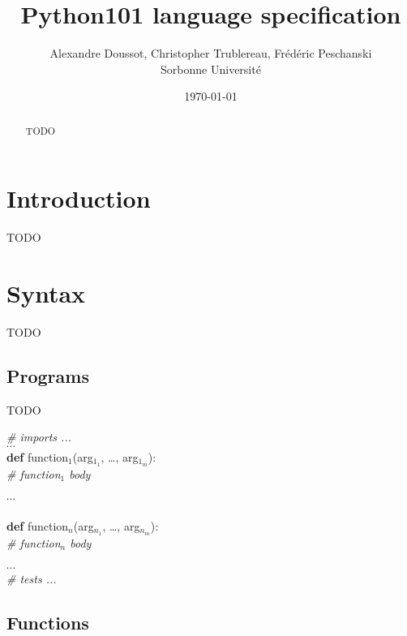 \documentclass[a4paper]{article}
\newenvironment{program}{
\begin{sffamily}
\begin{scriptsize}
\begin{tabbing}}
{\end{tabbing}
\end{scriptsize}
\end{sffamily}}
\newcommand{\kw}[1]{\textsf{\textbf{#1}}}
\newcommand{\cmt}[1]{\textsf{\textit{#1}}}
\newcommand{\pindent}{\hspace{2em}\=}
\begin{document}
\setlength{\parskip}{1ex}
\setlength{\parindent}{0mm}


\title{Python101 language specification}

\author{Alexandre Doussot, Christopher Trublereau, Fr\' ed\' eric Peschanski\\
Sorbonne Universit\' e}

\date{\today}

\maketitle
\begin{abstract}
TODO
\end{abstract}

\thispagestyle{fancy}

\section{Introduction}

TODO

\section{Syntax}

TODO

\subsection{Programs}

TODO

\begin{program}
\cmt{\# imports ...}\\
$\cdots$\\
\kw{def} function$_1$(arg$_{1_1}$, \ldots, arg$_{1_m}$):\\
\pindent \cmt{\# function$_1$ body}\\
\\
$\cdots$ \\
\\
\kw{def} function$_n$(arg$_{n_1}$, \ldots, arg$_{n_m}$):\\
\> \cmt{\# function$_n$ body}\\
\\
$\cdots$\\
\cmt{\# tests ...} \\
\end{program}

\subsection{Functions}
\end{document}

